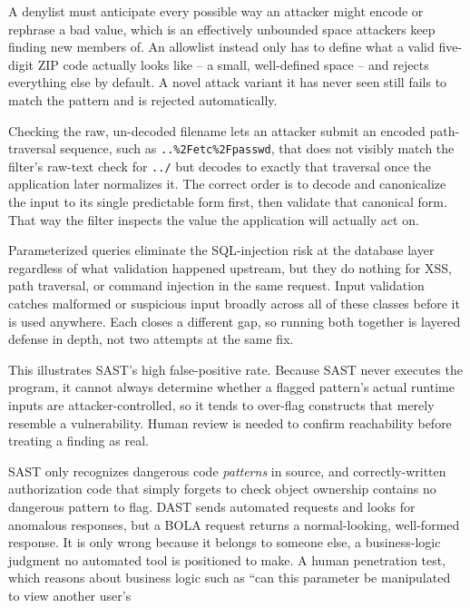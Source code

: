 \begin{answerkey}
\item A denylist must anticipate every possible way an attacker might encode or rephrase a bad
value, which is an effectively unbounded space attackers keep finding new members of. An allowlist
instead only has to define what a valid five-digit ZIP code actually looks like -- a small,
well-defined space -- and rejects everything else by default. A novel attack variant it has never
seen still fails to match the pattern and is rejected automatically.
\item Checking the raw, un-decoded filename lets an attacker submit an encoded path-traversal
sequence, such as \texttt{..\%2Fetc\%2Fpasswd}, that does not visibly match the filter's raw-text
check for \texttt{../} but decodes to exactly that traversal once the application later normalizes
it. The correct order is to decode and canonicalize the input to its single predictable form first,
then validate that canonical form. That way the filter inspects the value the application will
actually act on.
\item Parameterized queries eliminate the SQL-injection risk at the database layer regardless of
what validation happened upstream, but they do nothing for XSS, path traversal, or command
injection in the same request. Input validation catches malformed or suspicious input broadly across
all of these classes before it is used anywhere. Each closes a different gap, so running both
together is layered defense in depth, not two attempts at the same fix.
\item This illustrates SAST's high false-positive rate. Because SAST never executes the program, it
cannot always determine whether a flagged pattern's actual runtime inputs are attacker-controlled,
so it tends to over-flag constructs that merely resemble a vulnerability. Human review is needed to
confirm reachability before treating a finding as real.
\item SAST only recognizes dangerous code \emph{patterns} in source, and correctly-written
authorization code that simply forgets to check object ownership contains no dangerous pattern to
flag. DAST sends automated requests and looks for anomalous responses, but a BOLA request returns a
normal-looking, well-formed response. It is only wrong because it belongs to someone else, a
business-logic judgment no automated tool is positioned to make. A human penetration test, which
reasons about business logic such as ``can this parameter be manipulated to view another user's

\end{answerkey}
